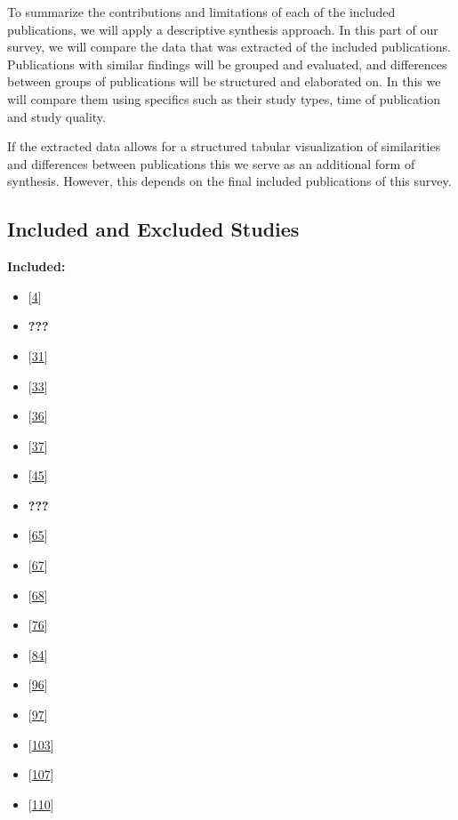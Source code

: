 \documentclass[]{book}
\providecommand{\tightlist}{%
  \setlength{\itemsep}{0pt}\setlength{\parskip}{0pt}}
\begin{document}
To summarize the contributions and limitations of each of the included
publications, we will apply a descriptive synthesis approach. In this
part of our survey, we will compare the data that was extracted of the
included publications. Publications with similar findings will be
grouped and evaluated, and differences between groups of publications
will be structured and elaborated on. In this we will compare them using
specifics such as their study types, time of publication and study
quality.

If the extracted data allows for a structured tabular visualization of
similarities and differences between publications this we serve as an
additional form of synthesis. However, this depends on the final
included publications of this survey.

\subsection{Included and Excluded
Studies}\label{included-and-excluded-studies}

\textbf{Included:}

\begin{itemize}
\tightlist
\item
  {[}\protect\hyperlink{ref-adams2016a}{4}{]}
\item
  \textbf{???}
\item
  {[}\protect\hyperlink{ref-cesar2017a}{31}{]}
\item
  {[}\protect\hyperlink{ref-claes2017a}{33}{]}
\item
  {[}\protect\hyperlink{ref-da2014a}{36}{]}
\item
  {[}\protect\hyperlink{ref-da2016a}{37}{]}
\item
  {[}\protect\hyperlink{ref-dyck2015a}{45}{]}
\item
  \textbf{???}
\item
  {[}\protect\hyperlink{ref-karvonen2017a}{65}{]}
\item
  {[}\protect\hyperlink{ref-kerzazi2013a}{67}{]}
\item
  {[}\protect\hyperlink{ref-khomh2015a}{68}{]}
\item
  {[}\protect\hyperlink{ref-laukkanen2018a}{76}{]}
\item
  {[}\protect\hyperlink{ref-mantyla2015a}{84}{]}
\item
  {[}\protect\hyperlink{ref-plewnia2014a}{96}{]}
\item
  {[}\protect\hyperlink{ref-poo-caamano2016a}{97}{]}
\item
  {[}\protect\hyperlink{ref-rodriguez2017a}{103}{]}
\item
  {[}\protect\hyperlink{ref-souza2015a}{107}{]}
\item
  {[}\protect\hyperlink{ref-teixeira2017a}{110}{]}
\end{itemize}
\end{document}
